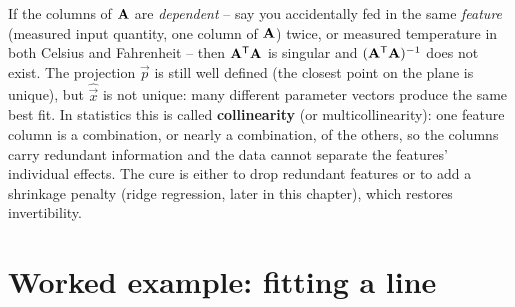 \begin{trapbox}
If the columns of $\mathbf{A}$ are \emph{dependent} -- say you accidentally fed in the same
\emph{feature} (measured input quantity, one column of $\mathbf{A}$) twice, or measured temperature in
both Celsius and Fahrenheit -- then $\mathbf{A}^{\mathsf{T}}\mathbf{A}$ is
singular and $(\mathbf{A}^{\mathsf{T}}\mathbf{A})^{-1}$ does not exist. The projection $\vec{p}$ is still
well defined (the closest point on the plane is unique), but $\hat{\vec{x}}$ is not unique: many
different parameter vectors produce the same best fit. In statistics this is called
\textbf{collinearity} (or multicollinearity): one feature column is a combination, or nearly a
combination, of the others, so the columns carry redundant information and the data cannot
separate the features' individual effects. The cure is either to drop redundant features or to
add a shrinkage penalty (ridge regression, later in this chapter), which restores invertibility.
\end{trapbox}

\section{Worked example: fitting a line}\label{ch19:sec-worked}


